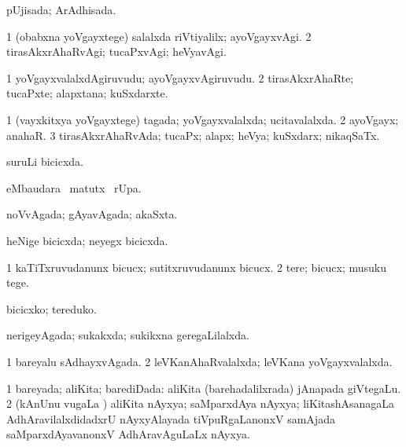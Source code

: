 \bentry
{} 
\gl{\gu}
\expl{}
\bmng
pUjisada; ArAdhisada. 
\emng
\eentry

\bentry
{} 
\gl{\kirxvi}
\expl{}
\bmng
\bnum
\num{1} (obabxna yoVgayxtege) salalxda riVtiyalilx; ayoVgayxvAgi. 
\num{2} tirasAkxrAhaRvAgi; tucaPxvAgi; heVyavAgi. 
\enum
\emng
\eentry

\bentry
{} 
\gl{\nA}
\expl{}
\bmng
\bnum
\num{1} yoVgayxvalalxdAgiruvudu; ayoVgayxvAgiruvudu. 
\num{2} tirasAkxrAhaRte; tucaPxte; alapxtana; kuSxdarxte. 
\enum
\emng
\eentry

\bentry
{} 
\gl{\gu}
\bmng
\bnum
\num{1} (vayxkitxya yoVgayxtege) tagada; yoVgayxvalalxda; ucitavalalxda. 
\num{2} ayoVgayx; anahaR. 
\num{3} tirasAkxrAhaRvAda; tucaPx; alapx; heVya; kuSxdarx; nikaqSaTx. 
\enum
\emng
\eentry

\bentry
{} 
\gl{\gu}
\expl{}
\bmng
suruLi bicicxda. 
\emng
\eentry

\bentry
{} 
\gl{\kirx}
\expl{}
\bmng
{} eMbaudara \BU\ matutx \BUkaq\ rUpa. 
\emng
\eentry

\bentry
{} 
\gl{\gu}
\expl{}
\bmng
noVvAgada; gAyavAgada; akaSxta. 
\emng
\eentry

\bentry
{} 
\gl{\gu}
\expl{}
\bmng
heNige bicicxda; neyegx bicicxda. 
\emng
\eentry

\bentry
{} 
\gl{\kirx}


\noindent
\gl{\sakirx}
\expl{}
\bmng
\bnum
\num{1} kaTiTxruvudanunx bicucx; sutitxruvudanunx bicucx. 
\num{2} tere; bicucx; musuku tege. 
\enum
\emng

\noindent
\gl{\akirx}
\expl{}
\bmng
bicicxko; tereduko. 
\emng
\eentry

\bentry
{} 
\gl{\gu}
\expl{}
\bmng
nerigeyAgada; sukakxda; sukikxna geregaLilalxda. 
\emng
\eentry

\bentry
{} 
\gl{\gu}
\expl{}
\bmng
\bnum
\num{1} bareyalu sAdhayxvAgada. 
\num{2} leVKanAhaRvalalxda; leVKana yoVgayxvalalxda. 
\enum
\emng
\eentry

\bentry
{} 
\gl{\gu}
\expl{}
\bmng
\bnum
\num{1} bareyada; aliKita; barediDada:  aliKita (barehadalilxrada) jAnapada giVtegaLu. 
\num{2} (kAnUnu \mo vugaLa \vi) aliKita nAyxya; saMparxdAya nAyxya; liKitashAsanagaLa AdhAravilalxdidadxrU nAyxyAlayada tiVpuRgaLanonxV samAjada saMparxdAyavanonxV AdhAravAguLaLx nAyxya. 
\enum
\emng
\eentry

